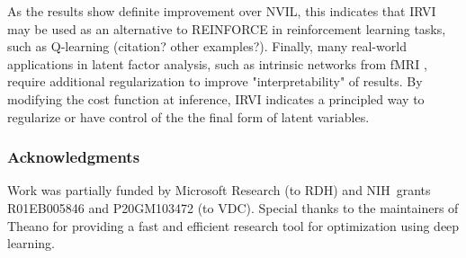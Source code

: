 \documentclass{article} %
\begin{document}
As the results show definite improvement over NVIL, this indicates that IRVI may be used as an alternative to REINFORCE in reinforcement learning tasks, such as Q-learning (citation? other examples?). Finally, many real-world applications in latent factor analysis, such as intrinsic networks from fMRI \citep{hjelm2014restricted}, require additional regularization to improve "interpretability" of results. By modifying the cost function at inference, IRVI indicates a principled way to regularize or have control of the the final form of latent variables.

\subsubsection*{Acknowledgments}
Work was partially funded by Microsoft Research (to RDH) and NIH\ grants R01EB005846 and P20GM103472 (to VDC). Special thanks to the maintainers of Theano for providing a fast and efficient research tool for optimization using deep learning.



\end{document}
